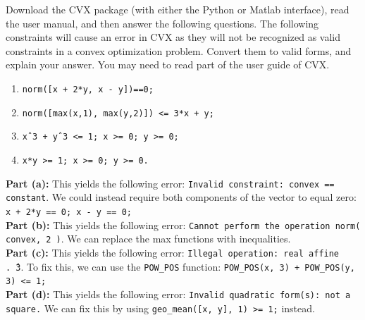 \documentclass[11pt]{article}
\begin{document}
\pagebreak

\begin{homeworkProblem}

    Download the CVX package (with either the Python or Matlab interface), read the user
    manual, and then answer the following questions. The following constraints will cause an
    error in CVX as they will not be recognized as valid constraints in a convex optimization
    problem. Convert them to valid forms, and explain your answer. You may need to read part
    of the user guide of CVX.

    \begin{enumerate}[label=(\alph*), topsep=5pt, itemsep=5pt]
        \item \texttt{norm([x + 2*y, x - y])==0;}
        \item \texttt{norm([max(x,1), max(y,2)]) <= 3*x + y;}
        \item \texttt{xˆ3 + yˆ3 <= 1; x >= 0; y >= 0;}
        \item \texttt{x*y >= 1; x >= 0; y >= 0.} \newline
    \end{enumerate}

    \solution

    \textbf{Part (a):} This yields the following error:  \texttt{Invalid constraint: {convex} == {constant}}. We could instead require both components of the vector to equal zero:
    \texttt{x + 2*y == 0; x - y == 0;} \\

    \textbf{Part (b):} This yields the following error:  \texttt{Cannot perform the operation norm( {convex}, 2 )}. We can replace the max functions with inequalities. \\

    \textbf{Part (c):} This yields the following error:  \texttt{Illegal operation: {real affine} .\^\ {3}}. To fix this, we can use the \texttt{POW\_POS} function: \texttt{POW\_POS(x, 3) + POW\_POS(y, 3) <= 1;} \\

    \textbf{Part (d):} This yields the following error: \texttt{Invalid quadratic form(s): not a square.} We can fix this by using \texttt{geo\_mean([x, y], 1) >= 1;} instead.

\end{homeworkProblem}

\pagebreak
\end{document}
